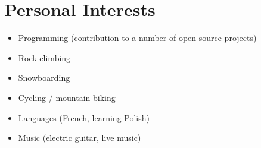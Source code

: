 \documentclass{cv}
\begin{document}

\section{Personal Interests}

\begin{itemize}
\item Programming (contribution to a number of open-source projects)
\item Rock climbing
\item Snowboarding
\item Cycling / mountain biking
\item Languages (French, learning Polish)
\item Music (electric guitar, live music)
\end{itemize}
\end{document}
